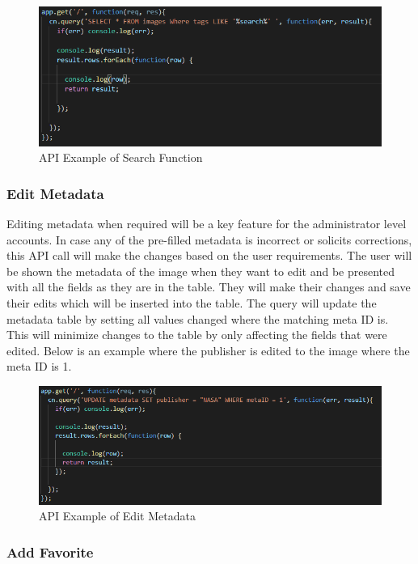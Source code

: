 \documentclass[12pt]{report}
\begin{document}
\begin{enumerate}
\begin{figure}[h]
	\centering
	\includegraphics[scale=0.5]{api_search}
	\caption{API Example of Search Function}
	\label{fig:API Search}
\end{figure}

\subsubsection*{Edit Metadata}

Editing metadata when required will be a key feature for the administrator level accounts.  In case any of the pre-filled metadata is incorrect or solicits corrections, this API call will make the changes based on the user requirements.  The user will be shown the metadata of the image when they want to edit and be presented with all the fields as they are in the table.  They will make their changes and save their edits which will be inserted into the table.  The query will update the metadata table by setting all values changed where the matching meta ID is.  This will minimize changes to the table by only affecting the fields that were edited.  Below is an example where the publisher is edited to the image where the meta ID is 1.

\begin{figure}[h]
	\centering
	\includegraphics[scale=0.5]{api_edit_metadata}
	\caption{API Example of Edit Metadata}
	\label{fig:API Edit Metadata}
\end{figure}

\subsubsection*{Add Favorite}


\end{enumerate}
\end{document}
